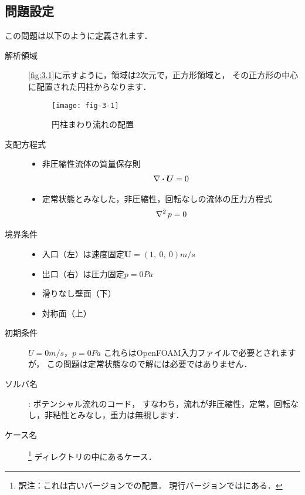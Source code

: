 \subsection{問題設定}
\label{ssec:3.1.1}
この問題は以下のように定義されます．
\begin{description}
 \item[解析領域] \autoref{fig:3.1}に示すように，領域は2次元で，正方形領域と，
            その正方形の中心に配置された円柱からなります．


\begin{figure}[ht]
 \texttt{[image: fig-3-1]}
 \caption{円柱まわり流れの配置}
 \label{fig:3.1}
\end{figure}


 \item[支配方程式] \mbox{}
            \begin{itemize}
             \item 非圧縮性流体の質量保存則
                   \begin{align}
                    \label{eq:3.1}
                    \nabla \inProd \bm{U} = 0
                   \end{align}
             \item 定常状態とみなした，非圧縮性，回転なしの流体の圧力方程式
                   \begin{align}
                    \label{eq:3.2}
                    \Laplacian p = 0
                   \end{align}
            \end{itemize}
 \item[境界条件] \mbox{}
            \begin{itemize}
             \item 入口（左）は速度固定$\bm{U} = (1,\ 0,\ 0) \unit{m/s}$
             \item 出口（右）は圧力固定$p = 0 \unit{Pa}$
             \item 滑りなし壁面（下）
             \item 対称面（上）
            \end{itemize}
 \item[初期条件] $U = 0 \unit{m/s}$，$p = 0 \unit{Pa}$\jdash
            これらはOpenFOAM入力ファイルで必要とされますが，
            この問題は定常状態なので解には必要ではありません．
%
%
 \item[ソルバ名] : ポテンシャル流れのコード，
            すなわち，流れが非圧縮性，定常，回転なし，非粘性とみなし，重力は無視します．
 \item[ケース名] %
\footnote{訳注：これは古いバージョンでの配置．
現行バージョンではにある．}%
            ディレクトリの中にあるケース．
\end{description}


